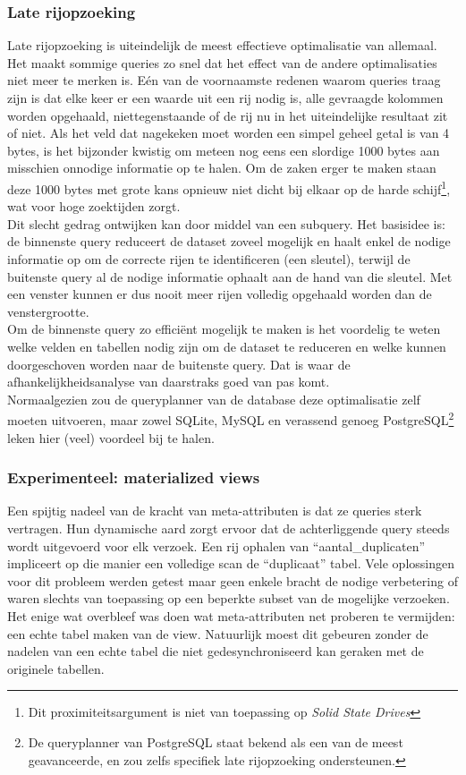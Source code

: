 \subsubsection{Late rijopzoeking}
Late rijopzoeking is uiteindelijk de meest effectieve optimalisatie van allemaal. Het maakt sommige queries zo snel dat het effect van de andere optimalisaties niet meer te merken is. E\'en van de voornaamste redenen waarom queries traag zijn is dat elke keer er een waarde uit een rij nodig is, alle gevraagde kolommen worden opgehaald, niettegenstaande of de rij nu in het uiteindelijke resultaat zit of niet. Als het veld dat nagekeken moet worden een simpel geheel getal is van 4 bytes, is het bijzonder kwistig om meteen nog eens een slordige 1000 bytes aan misschien onnodige informatie op te halen. Om de zaken erger te maken staan deze 1000 bytes met grote kans opnieuw niet dicht bij elkaar op de harde schijf\footnote{Dit proximiteitsargument is niet van toepassing op \emph{Solid State Drives}}, wat voor hoge zoektijden zorgt.\\

Dit slecht gedrag ontwijken kan door middel van een subquery. Het basisidee is: de binnenste query reduceert de dataset zoveel mogelijk en haalt enkel de nodige informatie op om de correcte rijen te identificeren (een sleutel), terwijl de buitenste query al de nodige informatie ophaalt aan de hand van die sleutel. Met een venster kunnen er dus nooit meer rijen volledig opgehaald worden dan de venstergrootte.\\

Om de binnenste query zo effici\"ent mogelijk te maken is het voordelig te weten welke velden en tabellen nodig zijn om de dataset te reduceren en welke kunnen doorgeschoven worden naar de buitenste query. Dat is waar de afhankelijkheidsanalyse van daarstraks goed van pas komt.\\

Normaalgezien zou de queryplanner van de database deze optimalisatie zelf moeten uitvoeren, maar zowel SQLite, MySQL en verassend genoeg PostgreSQL\footnote{De queryplanner van PostgreSQL staat bekend als een van de meest geavanceerde, en zou zelfs specifiek late rijopzoeking ondersteunen.} leken hier (veel) voordeel bij te halen.

\subsubsection{Experimenteel: materialized views}
Een spijtig nadeel van de kracht van meta-attributen is dat ze queries sterk vertragen. Hun dynamische aard zorgt ervoor dat de achterliggende query steeds wordt uitgevoerd voor elk verzoek. Een rij ophalen van ``aantal\_duplicaten'' impliceert op die manier een volledige scan de ``duplicaat'' tabel. Vele oplossingen voor dit probleem werden getest maar geen enkele bracht de nodige verbetering of waren slechts van toepassing op een beperkte subset van de mogelijke verzoeken. Het enige wat overbleef was doen wat meta-attributen net proberen te vermijden: een echte tabel maken van de view. Natuurlijk moest dit gebeuren zonder de nadelen van een echte tabel die niet gedesynchroniseerd kan geraken met de originele tabellen.\\

